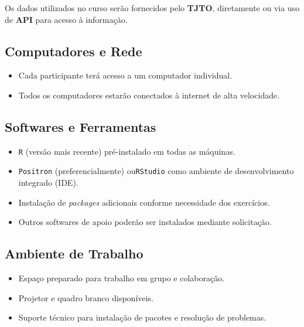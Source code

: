 \documentclass[
  letterpaper,
  DIV=11,
  numbers=noendperiod]{scrreprt}
\providecommand{\tightlist}{%
  \setlength{\itemsep}{0pt}\setlength{\parskip}{0pt}}
\begin{document}
Os dados utilizados no curso serão fornecidos pelo \textbf{TJTO},
diretamente ou via uso de \textbf{API} para acesso à informação.

\subsection{Computadores e Rede}\label{computadores-e-rede}

\begin{itemize}
\tightlist
\item
  Cada participante terá acesso a um computador individual.\\
\item
  Todos os computadores estarão conectados à internet de alta
  velocidade.
\end{itemize}

\subsection{Softwares e Ferramentas}\label{softwares-e-ferramentas}

\begin{itemize}
\tightlist
\item
  \texttt{R} (versão mais recente) pré-instalado em todas as máquinas.
\item
  \texttt{Positron} (preferencialmente) ou\texttt{RStudio} como ambiente
  de desenvolvimento integrado (IDE).\\
\item
  Instalação de \emph{packages} adicionais conforme necessidade dos
  exercícios.\\
\item
  Outros softwares de apoio poderão ser instalados mediante solicitação.
\end{itemize}

\subsection{Ambiente de Trabalho}\label{ambiente-de-trabalho}

\begin{itemize}
\tightlist
\item
  Espaço preparado para trabalho em grupo e colaboração.\\
\item
  Projetor e quadro branco disponíveis.\\
\item
  Suporte técnico para instalação de pacotes e resolução de problemas.
\end{itemize}
\end{document}
